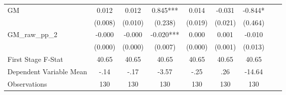 \begin{tabular}{l*{8}{c}}
GM              &    0.012   &    0.012   &    0.845***&    0.014   &   -0.031   &   -0.844*  \\
                &  (0.008)   &  (0.010)   &  (0.238)   &  (0.019)   &  (0.021)   &  (0.464)   \\
\addlinespace
GM\_raw\_pp\_2     &   -0.000   &   -0.000   &   -0.020***&    0.000   &    0.001   &   -0.010   \\
                &  (0.000)   &  (0.000)   &  (0.007)   &  (0.000)   &  (0.001)   &  (0.013)   \\
\midrule
First Stage F-Stat&    40.65   &    40.65   &    40.65   &    40.65   &    40.65   &    40.65   \\
Dependent Variable Mean&     -.14   &     -.17   &    -3.57   &     -.25   &      .26   &   -14.64   \\
Observations    &      130   &      130   &      130   &      130   &      130   &      130   \\
       \bottomrule \end{tabular}
